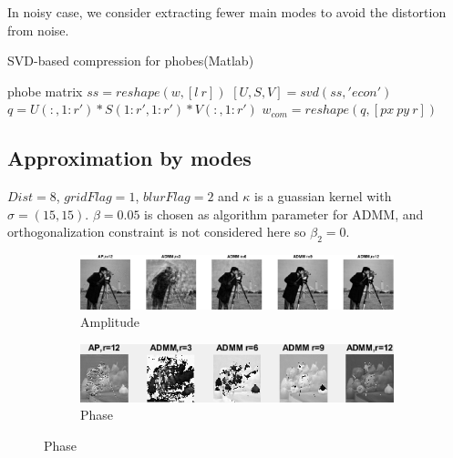 \documentclass{article}
\numberwithin{equation}{section}
\begin{document}
\begin{enumerate}[leftmargin=*,listparindent=20pt]
In noisy case, we consider extracting fewer main modes to avoid the distortion from noise.
\begin{algorithm}
    \caption{SVD-based compression for phobes(Matlab)}
    \label{alg:compression}
    phobe matrix $ss = reshape(w,[l\ r])$ \;
    $[U,S,V] = svd(ss,'econ')$ \;
    $q = U(:,1:r')*S(1:r',1:r')*V(:,1:r')$ \;
    $w_{com} = reshape(q,[px \ py \  r])$ \;
   
\end{algorithm}
\end{enumerate}

\subsection{Approximation by modes}
$Dist=8$, $gridFlag=1$, $blurFlag=2$ and $\kappa$ is a guassian kernel with $\sigma = (15,15)$. $\beta=0.05$ is chosen as algorithm parameter for ADMM, and orthogonalization constraint is not considered here so $\beta_2 = 0$.



\begin{figure}[H]
\centering
\caption{}
\begin{subfigure}{1\textwidth}
    \centering
    \includegraphics[width=0.9\linewidth]{figures/modes_u.eps}  
   \caption{Amplitude}
    \label{fig:modes_u}
 \end{subfigure}
 \begin{subfigure}{1\textwidth}
    \centering
    \includegraphics[width=.9\linewidth]{figures/modes_u_phaze.png}  
    \caption{Phase}
    \label{fig:modes_u_phaze}
 \end{subfigure}
 
    \label{fig:modes_images}

 \end{figure}
 
\end{document}
